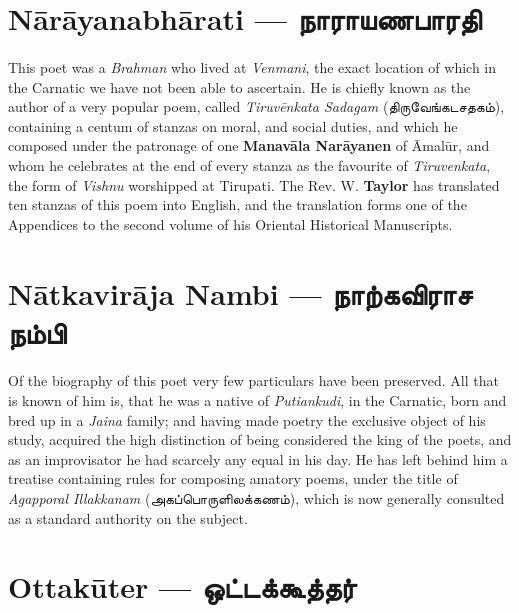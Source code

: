 \documentclass{article}
\newcommand{\TamilText}[1]{\texttamil{#1}}
\newcommand{\TamilBold}[1]{\texttamil{\textbf{#1}}}
\newcommand{\tam}[1]{\TamilText{#1}}
\newcommand{\tambold}[1]{\TamilBold{#1}}
\begin{document}
\section{N\={a}r\={a}yanabh\={a}rati --- \tambold{நாராயணபாரதி}}
\paragraph{}
This poet was a \emph{Brahman} who lived at \emph{Venmani}, the exact location of which in the Carnatic we have not been able to ascertain. He is chiefly known as the author of a very popular poem, called \emph{Tiruv\={e}nkata Sadagam} (\tam{திருவேங்கடசதகம்}), containing a centum of stanzas on moral, and social duties, and which he composed under the patronage of one \textbf{Manav\={a}la Nar\={a}yanen} of \={A}mal\={u}r, and whom he celebrates at the end of every stanza as the favourite of \emph{Tiruvenkata}, the form of \emph{Vishnu} worshipped at Tirupati. The Rev. W. \textbf{Taylor} has translated ten stanzas of this poem into English, and the translation forms one of the Appendices to the second volume of his Oriental Historical Manuscripts.

\section{N\={a}tkavir\={a}ja Nambi --- \tambold{நாற்கவிராச நம்பி}}
\paragraph{}
Of the biography of this poet very few particulars have been preserved. All that is known of him is, that he was a native of \emph{Putiankudi}, in the Carnatic, born and bred up in a \emph{Jaina} family; and having made poetry the exclusive object of his study, acquired the high distinction of being considered the king of the poets, and as an improvisator he had scarcely any equal in his day. He has left behind him a treatise containing rules for composing amatory poems, under the title of \emph{Agapporal Illakkanam} (\tam{அகப்பொருளிலக்கணம்}), which is now generally consulted as a standard authority on the subject.

\section{Ottak\={u}ter --- \tambold{ஒட்டக்கூத்தர்}}
\end{document}
